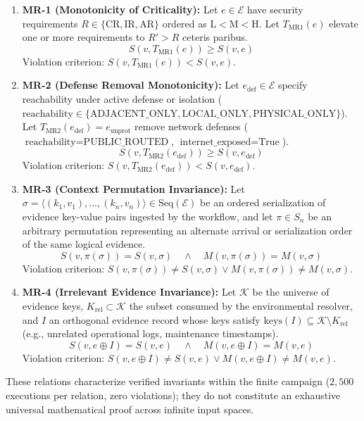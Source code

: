 \documentclass[conference]{IEEEtran}
\begin{document}
\begin{enumerate}
\item \textbf{MR-1 (Monotonicity of Criticality):} Let $e \in \mathcal{E}$ have security requirements $R \in \{\text{CR}, \text{IR}, \text{AR}\}$ ordered as $\text{L} < \text{M} < \text{H}$. Let $T_{\text{MR1}}(e)$ elevate one or more requirements to $R' > R$ ceteris paribus.
\begin{equation}
S(v, T_{\text{MR1}}(e)) \ge S(v, e)
\end{equation}
Violation criterion: $S(v, T_{\text{MR1}}(e)) < S(v, e)$.

\item \textbf{MR-2 (Defense Removal Monotonicity):} Let $e_{\text{def}} \in \mathcal{E}$ specify reachability under active defense or isolation ($\text{reachability} \in \{\text{ADJACENT\_ONLY}, \allowbreak \text{LOCAL\_ONLY}, \allowbreak \text{PHYSICAL\_ONLY}\}$). Let $T_{\text{MR2}}(e_{\text{def}}) = e_{\text{unprot}}$ remove network defenses ($\text{reachability} = \text{PUBLIC\_ROUTED}$, $\text{internet\_exposed} = \text{True}$).
\begin{equation}
S(v, T_{\text{MR2}}(e_{\text{def}})) \ge S(v, e_{\text{def}})
\end{equation}
Violation criterion: $S(v, T_{\text{MR2}}(e_{\text{def}})) < S(v, e_{\text{def}})$.

\item \textbf{MR-3 (Context Permutation Invariance):} Let $\sigma = \langle (k_1, v_1), \dots, (k_n, v_n) \rangle \in \text{Seq}(\mathcal{E})$ be an ordered serialization of evidence key-value pairs ingested by the workflow, and let $\pi \in S_n$ be an arbitrary permutation representing an alternate arrival or serialization order of the same logical evidence.
\begin{equation}
S(v, \pi(\sigma)) = S(v, \sigma) \quad \land \quad M(v, \pi(\sigma)) = M(v, \sigma)
\end{equation}
Violation criterion: $S(v, \pi(\sigma)) \ne S(v, \sigma) \lor M(v, \pi(\sigma)) \ne M(v, \sigma)$.

\item \textbf{MR-4 (Irrelevant Evidence Invariance):} Let $\mathcal{K}$ be the universe of evidence keys, $K_{\text{rel}} \subset \mathcal{K}$ the subset consumed by the environmental resolver, and $I$ an orthogonal evidence record whose keys satisfy $\text{keys}(I) \subseteq \mathcal{K} \setminus K_{\text{rel}}$ (e.g., unrelated operational logs, maintenance timestamps).
\begin{equation}
S(v, e \oplus I) = S(v, e) \quad \land \quad M(v, e \oplus I) = M(v, e)
\end{equation}
Violation criterion: $S(v, e \oplus I) \ne S(v, e) \lor M(v, e \oplus I) \ne M(v, e)$.
\end{enumerate}
These relations characterize verified invariants within the finite campaign ($2,500$ executions per relation, zero violations); they do not constitute an exhaustive universal mathematical proof across infinite input spaces.
\end{document}
